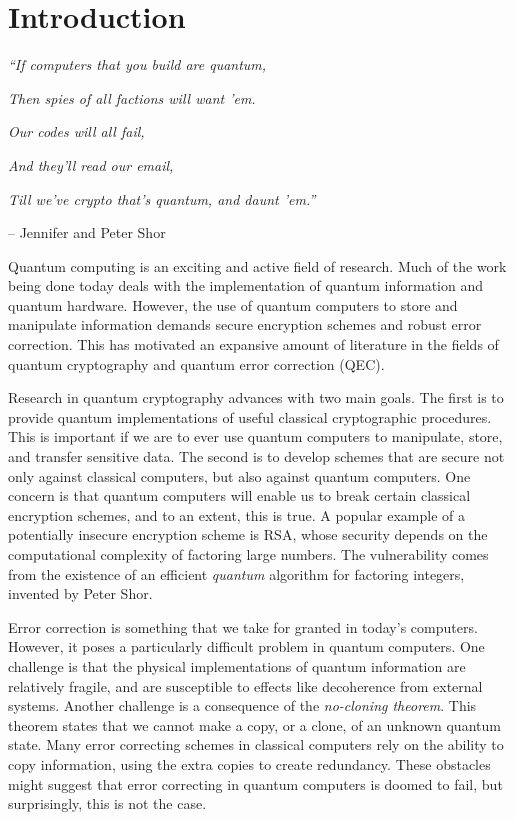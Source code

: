 \chapter{Introduction}
\label{introduction}


\textit{``If computers that you build are quantum,}

\textit{Then spies of all factions will want 'em.}

\textit{Our codes will all fail,}

\textit{And they'll read our email,}

\textit{Till we've crypto that's quantum, and daunt 'em.''}

\quad -- Jennifer and Peter Shor


Quantum computing is an exciting and active field of research. Much of the work being done today deals with the implementation of quantum information and quantum hardware. However, the use of quantum computers to store and manipulate information demands secure encryption schemes and robust error correction. This has motivated an expansive amount of literature in the fields of quantum cryptography and quantum error correction (QEC). 

Research in quantum cryptography advances with two main goals. The first is to provide quantum implementations of useful classical cryptographic procedures. This is important if we are to ever use quantum computers to manipulate, store, and transfer sensitive data. The second is to develop schemes that are secure not only against classical computers, but also against quantum computers. One concern is that quantum computers will enable us to break certain classical encryption schemes, and to an extent, this is true. A popular example of a potentially insecure encryption scheme is RSA, whose security depends on the computational complexity of factoring large numbers. The vulnerability comes from the existence of an efficient \textit{quantum} algorithm for factoring integers, invented by Peter Shor. 

Error correction is something that we take for granted in today's computers. However, it poses a particularly difficult problem in quantum computers. One challenge is that the physical implementations of quantum information are relatively fragile, and are susceptible to effects like decoherence from external systems. Another challenge is a consequence of the \textit{no-cloning theorem}. This theorem states that we cannot make a copy, or a clone, of an unknown quantum state. Many error correcting schemes in classical computers rely on the ability to copy information, using the extra copies to create redundancy. These obstacles might suggest that error correcting in quantum computers is doomed to fail, but surprisingly, this is not the case. 

